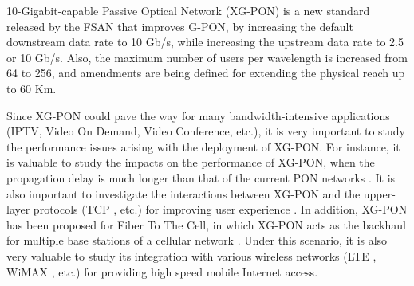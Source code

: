 10-Gigabit-capable Passive Optical Network (XG-PON) is a new
standard released by the FSAN that improves G-PON, by increasing
the default downstream data rate to 10 Gb/s, while increasing the
upstream data rate to 2.5 or 10 Gb/s. Also, the maximum number of
users per wavelength is increased from 64 to 256, and amendments
are being defined for extending the physical reach up to 60 Km.






Since XG-PON could pave the way for many bandwidth-intensive
applications (IPTV, Video On Demand, Video Conference, etc.), it
is very important to study the performance issues arising with the
deployment of XG-PON. For instance, it is valuable to study the
impacts on the performance of XG-PON, when the propagation delay
is much longer than that of the current PON networks
\cite{song09multithread4LRPON}. It is also important to
investigate the interactions between XG-PON and the upper-layer
protocols (TCP \cite{postel81tcp}, etc.) for improving user
experience \cite{ikeda09tcpPON}. In addition, XG-PON has been
proposed for Fiber To The Cell, in which XG-PON acts as the
backhaul for multiple base stations of a cellular network
\cite{itu10XGPON}. Under this scenario, it is also very valuable
to study its integration with various wireless networks (LTE
\cite{lte}, WiMAX \cite{ieee04wimax}, etc.) for providing high
speed mobile Internet access.

